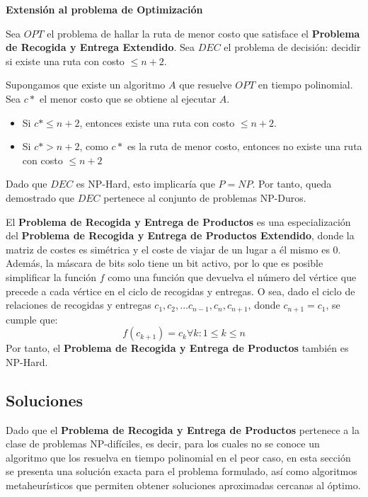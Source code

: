 \documentclass[twocolumn, fontsize=10pt]{article}
\theoremstyle{definition} %
\begin{document}
\textbf{Extensión al problema de Optimización}

Sea \(OPT\)  el problema de hallar la ruta de menor costo que satisface el \textbf{Problema de Recogida y Entrega Extendido}.
Sea \(DEC\) el problema de decisión: decidir si existe una ruta con costo  \( \leq n+2\).

Supongamos que existe un algoritmo \(A\) que resuelve \(OPT\) en tiempo polinomial. 
Sea \(c*\) el menor costo que se obtiene al ejecutar \(A\).
\begin{itemize}
    \item Si \(c* \leq n+2\), entonces existe una ruta con costo \(\leq n+2\).
    \item Si \(c* > n+2\), como \(c*\) es la ruta de menor costo, entonces no existe una ruta con costo \(\leq n+2\)
\end{itemize}

Dado que \(DEC\) es NP-Hard, esto implicaría que  \(P = NP\). Por tanto, queda demostrado que \(DEC\) pertenece al conjunto de problemas NP-Duros.

El \textbf{Problema de Recogida y Entrega de Productos}  es una especialización del \textbf{Problema de Recogida y Entrega de Productos Extendido}, donde la matriz de costes es simétrica y el coste de viajar de un lugar a él mismo es \(0\). Además, la máscara de bits solo tiene un bit activo, por lo que es posible simplificar la función \(f\) como una función que devuelva el número del vértice que precede a cada vértice en el ciclo de recogidas y entregas. O sea, dado el ciclo de relaciones de recogidas y entregas \(c_1,c_2,...c_{n-1},c_n,c_{n+1}\), donde \(c_{n+1}=c_1\), se cumple que:
\[
    f(c_{k+1})=c_k \forall k : 1 \leq k \leq n
\]
Por tanto, el \textbf{Problema de Recogida y Entrega de Productos} también es NP-Hard.

\subsection{Soluciones}
Dado que el \textbf{Problema de Recogida y Entrega de Productos} pertenece a la clase de problemas NP-difíciles, es decir, para los cuales no se conoce un algoritmo que los resuelva en tiempo polinomial en el peor caso, en esta sección se presenta una solución exacta para el problema formulado, así como algoritmos metaheurísticos que permiten obtener soluciones aproximadas cercanas al óptimo.
\end{document}
